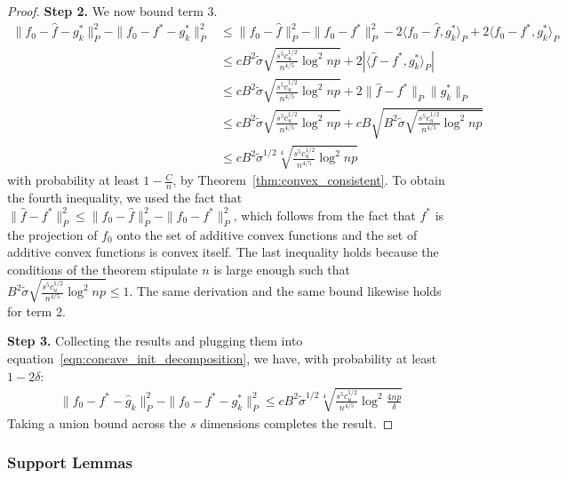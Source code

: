 \documentclass[12pt,pdftex,aos,noinfoline,addressasfootnote]{imsart}
\begin{document}
\begin{proof}
\textbf{Step 2.} We now bound term 3.
\begin{align*}
\| f_0 - \hat{f} - g^*_k \|_P^2 - \| f_0 - f^* - g^*_k\|_P^2 &\leq 
    \| f_0 - \hat{f} \|_P^2 - \|f_0 - f^*\|_P^2 - 2\langle f_0 - \hat{f}, g^*_k \rangle_P
   + 2 \langle f_0 - f^*, g^*_k \rangle_P \\
 &\leq c B^2 \tilde{\sigma} \sqrt{ \frac{s^5 c_u^{1/2}}{n^{4/5}} \log^2 np} + 
    2 | \langle \hat{f} - f^*, g^*_k \rangle_P |  \\
 &\leq  c B^2 \tilde{\sigma} \sqrt{ \frac{s^5 c_u^{1/2}}{n^{4/5}} \log^2 np} +
    2 \| \hat{f} - f^* \|_P \| g^*_k \|_P \\
&\leq  c B^2 \tilde{\sigma} \sqrt{ \frac{s^5 c_u^{1/2}}{n^{4/5}} \log^2 np} +
   c B \sqrt{B^2 \tilde{\sigma} \sqrt{ 
                   \frac{s^5 c_u^{1/2}}{n^{4/5}} \log^2 np} }\\
&\leq  cB^2 \tilde{\sigma}^{1/2} \sqrt[4]{ 
                   \frac{s^5 c_u^{1/2}}{n^{4/5}} \log^2 np} 
\end{align*}
with probability at least $1-\frac{C}{n}$, by
Theorem~\ref{thm:convex_consistent}. To obtain the fourth inequality,
we used the fact that $\| \hat{f} - f^* \|_P^2 \leq \| f_0 - \hat{f}
\|_P^2 - \|f_0 - f^*\|_P^2$, which follows from the fact that $f^*$ is the
projection of $f_0$ onto the set of additive convex functions and the
set of additive convex functions is convex itself.
The last inequality holds because the conditions of the theorem stipulate $n$
is large enough such that $B^2 \tilde{\sigma} \sqrt{ \frac{s^5c_u^{1/2}}{n^{4/5}} \log^2 np} \leq 1$.
The same derivation and the same bound likewise holds for term 2.

\textbf{Step 3.} Collecting the results and plugging them into equation~\eqref{eqn:concave_init_decomposition}, we have, with probability at least $1-2\delta$:
\begin{align*}
\| f_0 - f^* - \hat{g}_k \|_P^2 - \|f_0 - f^* - g^*_k \|_P^2 \leq
   c B^2 \tilde{\sigma}^{1/2} 
     \sqrt[4]{ \frac{s^5c_u^{1/2}}{n^{4/5}} \log^2 \frac{4np}{\delta}} 
\end{align*}
Taking a union bound across the $s$ dimensions completes the result.
\end{proof}



\subsubsection{Support Lemmas}

\end{document}
